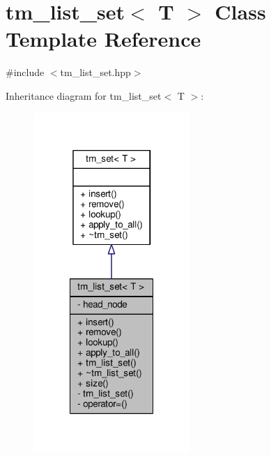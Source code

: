 \hypertarget{classtm__list__set}{\section{tm\-\_\-list\-\_\-set$<$ T $>$ Class Template Reference}
\label{classtm__list__set}
}


{\ttfamily \#include $<$tm\-\_\-list\-\_\-set.\-hpp$>$}



Inheritance diagram for tm\-\_\-list\-\_\-set$<$ T $>$\-:
\nopagebreak
\begin{figure}[H]
\begin{center}
\leavevmode
\includegraphics[width=168pt]{classtm__list__set__inherit__graph}
\end{center}
\end{figure}


